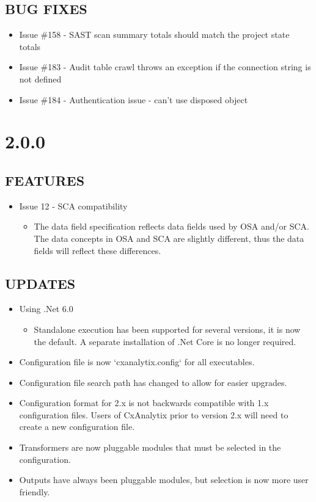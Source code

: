 \subsection*{BUG FIXES}
    \begin{itemize}
        \item Issue \#158 - SAST scan summary totals should match the project state totals
        \item Issue \#183 - Audit table crawl throws an exception if the connection string is not defined
        \item Issue \#184 - Authentication issue - can't use disposed object
    \end{itemize}


\section{2.0.0}

\subsection*{FEATURES}
    \begin{itemize}
        \item Issue 12 - SCA compatibility
        \begin{itemize}
            \item The data field specification reflects data fields used by OSA and/or SCA.  The data concepts in OSA and SCA 
            are slightly different, thus the data fields will reflect these differences.
        \end{itemize}
    \end{itemize}

\subsection*{UPDATES}
    \begin{itemize}
        \item Using .Net 6.0
            \begin{itemize}
                \item Standalone execution has been supported for several versions, it is now the default.  A separate installation of .Net Core is no longer required.
            \end{itemize}
        \item Configuration file is now `cxanalytix.config` for all executables.
        \item Configuration file search path has changed to allow for easier upgrades.
        \item Configuration format for 2.x is not backwards compatible with 1.x configuration files.  Users of CxAnalytix prior to version 2.x will need 
        to create a new configuration file.
        \item Transformers are now pluggable modules that must be selected in the configuration.
        \item Outputs have always been pluggable modules, but selection is now more user friendly.
    \end{itemize}

